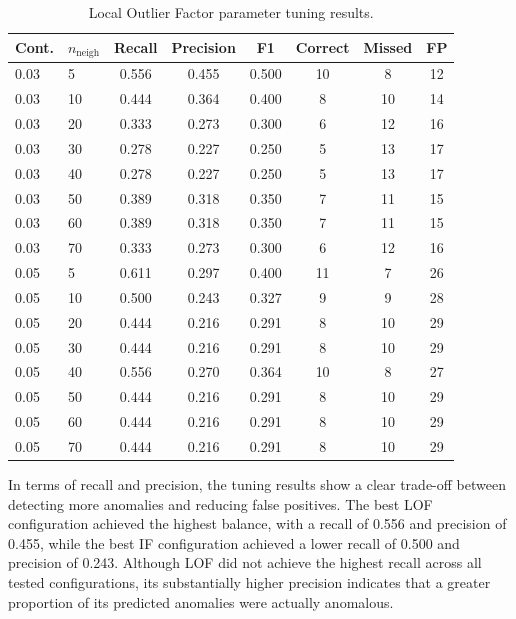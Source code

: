 \documentclass[a4paper,12pt]{article}
\begin{document}
\begin{table}
	\centering
	\small
	\setlength{\tabcolsep}{5pt}
	\caption{Local Outlier Factor parameter tuning results.}
	\label{tab:lof_tuning}
	\begin{tabular}{llcccccc}
		\hline
		Cont. & $n_{\mathrm{neigh}}$ & Recall & Precision & F1 & Correct & Missed & FP \\
		\hline
		0.03 & 5  & 0.556 & 0.455 & 0.500 & 10 & 8 & 12 \\
		0.03 & 10 & 0.444 & 0.364 & 0.400 & 8 & 10 & 14 \\
		0.03 & 20 & 0.333 & 0.273 & 0.300 & 6 & 12 & 16 \\
		0.03 & 30 & 0.278 & 0.227 & 0.250 & 5 & 13 & 17 \\
		0.03 & 40 & 0.278 & 0.227 & 0.250 & 5 & 13 & 17 \\
		0.03 & 50 & 0.389 & 0.318 & 0.350 & 7 & 11 & 15 \\
		0.03 & 60 & 0.389 & 0.318 & 0.350 & 7 & 11 & 15 \\
		0.03 & 70 & 0.333 & 0.273 & 0.300 & 6 & 12 & 16 \\
		0.05 & 5  & 0.611 & 0.297 & 0.400 & 11 & 7 & 26 \\
		0.05 & 10 & 0.500 & 0.243 & 0.327 & 9 & 9 & 28 \\
		0.05 & 20 & 0.444 & 0.216 & 0.291 & 8 & 10 & 29 \\
		0.05 & 30 & 0.444 & 0.216 & 0.291 & 8 & 10 & 29 \\
		0.05 & 40 & 0.556 & 0.270 & 0.364 & 10 & 8 & 27 \\
		0.05 & 50 & 0.444 & 0.216 & 0.291 & 8 & 10 & 29 \\
		0.05 & 60 & 0.444 & 0.216 & 0.291 & 8 & 10 & 29 \\
		0.05 & 70 & 0.444 & 0.216 & 0.291 & 8 & 10 & 29 \\
		\hline
	\end{tabular}
\end{table}

In terms of recall and precision, the tuning results show a clear trade-off between detecting more anomalies and reducing false positives. The best LOF configuration achieved the highest balance, with a recall of 0.556 and precision of 0.455, while the best IF configuration achieved a lower recall of 0.500 and precision of 0.243. Although LOF did not achieve the highest recall across all tested configurations, its substantially higher precision indicates that a greater proportion of its predicted anomalies were actually anomalous.
\end{document}
